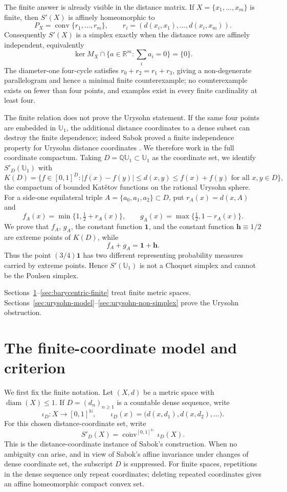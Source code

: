 \documentclass{proc-l}
\numberwithin{equation}{section}
\theoremstyle{definition}
\theoremstyle{remark}
\newcommand{\N}{\mathbb N}
\newcommand{\R}{\mathbb R}
\newcommand{\one}{\mathbf 1}
\newcommand{\half}{\mathbf h}
\newcommand{\conv}{\operatorname{conv}}
\newcommand{\diam}{\operatorname{diam}}
\begin{document}
The finite answer is already visible in the distance matrix.  If
\(X=\{x_1,\ldots,x_m\}\) is finite, then \(S'(X)\) is affinely homeomorphic to
\[
        P_X=\conv\{r_1,\ldots,r_m\},
        \qquad
        r_i=(d(x_i,x_1),\ldots,d(x_i,x_m)).
\]
Consequently \(S'(X)\) is a simplex exactly when the distance rows are affinely
independent, equivalently
\[
        \ker M_X\cap\{a\in\R^m:\sum_i a_i=0\}=\{0\}.
\]
The diameter-one four-cycle satisfies \(r_0+r_2=r_1+r_3\), giving a
non-degenerate parallelogram and hence a minimal finite counterexample; no
counterexample exists on fewer than four points, and examples exist in every
finite cardinality at least four.

The finite relation does not prove the Urysohn statement.  If the same four
points are embedded in \(\mathbb U_1\), the additional distance coordinates to a
dense subset can destroy the finite dependence; indeed Sabok proved a finite
independence property for Urysohn distance coordinates
\cite[Proposition~5.15]{Sabok2016}.  We therefore work in the full
coordinate compactum.  Taking \(D=\mathbb Q\mathbb U_1\subset\mathbb U_1\) as the
coordinate set, we identify \(S'_D(\mathbb U_1)\) with
\[
        K(D)=\{f\in[0,1]^D: |f(x)-f(y)|\le d(x,y)\le f(x)+f(y)
        \text{ for all }x,y\in D\},
\]
the compactum of bounded Kat\v{e}tov functions on the rational Urysohn sphere.
For a side-one equilateral triple \(A=\{a_0,a_1,a_2\}\subset D\), put
\(r_A(x)=d(x,A)\) and
\[
        f_A(x)=\min\{1,\tfrac12+r_A(x)\},\qquad
        g_A(x)=\max\{\tfrac12,1-r_A(x)\}.
\]
We prove that \(f_A\), \(g_A\), the constant function \(\one\), and the constant
function \(\half\equiv1/2\) are extreme points of \(K(D)\), while
\[
        f_A+g_A=\one+\half.
\]
Thus the point \((3/4)\one\) has two different representing probability measures
carried by extreme points.  Hence \(S'(\mathbb U_1)\) is not a Choquet simplex
and cannot be the Poulsen simplex.

Sections~\ref{sec:finite-model}--\ref{sec:barycentric-finite} treat finite
metric spaces.  Sections~\ref{sec:urysohn-model}--\ref{sec:urysohn-non-simplex}
prove the Urysohn obstruction.

\section{The finite-coordinate model and criterion}
\label{sec:finite-model}

We first fix the finite notation.  Let \((X,d)\) be a metric space with
\(\diam(X)\le1\).  If \(D=(d_n)_{n\ge1}\) is a countable dense sequence, write
\[
        \iota_D:X\longrightarrow[0,1]^\N,
        \qquad
        \iota_D(x)=\bigl(d(x,d_1),d(x,d_2),\ldots\bigr).
\]
For this chosen distance-coordinate set, write
\[
        S'_D(X)=\overline{\conv}^{[0,1]^\N}\,\iota_D(X).
\]
This is the distance-coordinate instance of Sabok's construction.  When no
ambiguity can arise, and in view of Sabok's affine invariance under changes of
dense coordinate set, the subscript \(D\) is suppressed.  For finite
spaces, repetitions in the dense sequence only repeat coordinates; deleting
repeated coordinates gives an affine homeomorphic compact convex set.
\end{document}
